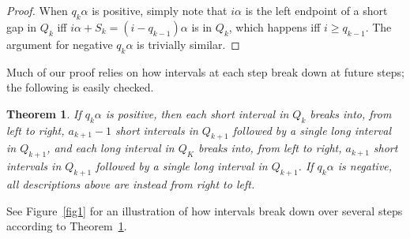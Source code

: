 \documentclass[11pt,reqno]{amsart}
\newtheorem{theorem}{Theorem}[section]
\theoremstyle{definition}
\theoremstyle{plain}
\begin{document}
\begin{proof}
When $q_k \alpha$ is positive, simply note that $i\alpha$ is the left endpoint of a short gap in $Q_k$ iff $i \alpha + S_k = (i - q_{k-1}) \alpha$ is in $Q_k$, which happens iff $i \geq q_{k-1}$. The argument for negative $q_k \alpha$ is trivially similar.
\end{proof}

Much of our proof relies on how intervals at each step break down at future steps; the following is easily checked.

\begin{theorem}\label{decomp}
If $q_k \alpha$ is positive, then each short interval in $Q_k$ breaks into, from left to right, $a_{k+1} - 1$ short intervals in $Q_{k+1}$ followed by a single long interval in $Q_{k+1}$, and each long interval in $Q_K$ breaks into, from left to right, $a_{k+1}$ short intervals in $Q_{k+1}$ followed by a single long interval in $Q_{k+1}$. If $q_k \alpha$ is negative, all descriptions above are instead from right to left. 
\end{theorem}

See Figure~\ref{fig1} for an illustration of how intervals break down over several steps according to Theorem~\ref{decomp}. 
\end{document}
